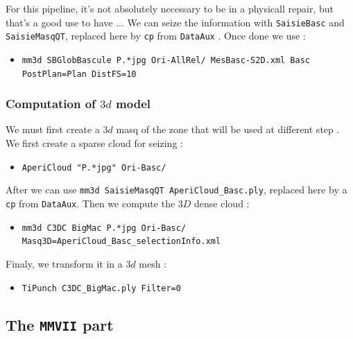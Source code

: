 For  this pipeline, it's not absolutely necessary to be in a physicall repair,
but that's a good use to have ... We can seize the information with
{\tt SaisieBasc} and {\tt SaisieMasqQT}, replaced here by {\tt cp} from {\tt DataAux} . 
Once done we use :

\begin{itemize}
    \item {\tt mm3d SBGlobBascule P.*jpg Ori-AllRel/ MesBasc-S2D.xml Basc  PostPlan=Plan DistFS=10}
\end{itemize}


\subsubsection{Computation of $3d$ model}

We must first create a $3d$ masq of the zone that will be used at different step .
We first create a sparse cloud for seizing :

\begin{itemize}
	\item {\tt AperiCloud "P.*jpg" Ori-Basc/}
\end{itemize}

After we can use {\tt mm3d SaisieMasqQT AperiCloud\_Basc.ply}, 
replaced here by a {\tt cp} from {\tt DataAux}.
Then we compute the $3D$ dense cloud :

\begin{itemize}
	\item {\tt mm3d C3DC BigMac P.*jpg Ori-Basc/ Masq3D=AperiCloud\_Basc\_selectionInfo.xml}
\end{itemize}

Finaly, we transform it in a $3d$ mesh :

\begin{itemize}
	\item {\tt TiPunch C3DC\_BigMac.ply Filter=0}
\end{itemize}


\subsection{The  {\tt MMVII} part}


